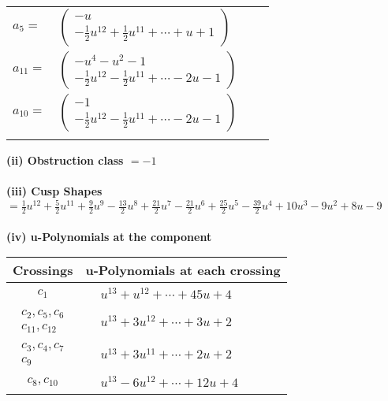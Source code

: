 \documentclass[1p]{elsarticle_modified}
\theoremstyle{definition}
\begin{document}
\begin{tabular}{m{7pt} m{180pt} m{7pt} m{180pt} }
\flushright $a_{5}=$&$\begin{pmatrix}- u\\-\frac{1}{2} u^{12}+\frac{1}{2} u^{11}+\cdots+u+1\end{pmatrix}$ \\
\flushright $a_{11}=$&$\begin{pmatrix}- u^4- u^2-1\\-\frac{1}{2} u^{12}-\frac{1}{2} u^{11}+\cdots-2 u-1\end{pmatrix}$ \\
\flushright $a_{10}=$&$\begin{pmatrix}-1\\-\frac{1}{2} u^{12}-\frac{1}{2} u^{11}+\cdots-2 u-1\end{pmatrix}$\\&\end{tabular}
\flushleft \textbf{(ii) Obstruction class $= -1$}\\~\\
\flushleft \textbf{(iii) Cusp Shapes $= \frac{1}{2} u^{12}+\frac{5}{2} u^{11}+\frac{9}{2} u^9-\frac{13}{2} u^8+\frac{21}{2} u^7-\frac{21}{2} u^6+\frac{25}{2} u^5-\frac{39}{2} u^4+10 u^3-9 u^2+8 u-9$}\\~\\
\newpage\renewcommand{\arraystretch}{1}
\flushleft \textbf{(iv) u-Polynomials at the component}\newline \\
\begin{tabular}{m{50pt}|m{274pt}}
Crossings & \hspace{64pt}u-Polynomials at each crossing \\
\hline $$\begin{aligned}c_{1}\end{aligned}$$&$\begin{aligned}
&u^{13}+u^{12}+\cdots+45 u+4
\end{aligned}$\\
\hline $$\begin{aligned}c_{2},c_{5},c_{6}\\c_{11},c_{12}\end{aligned}$$&$\begin{aligned}
&u^{13}+3 u^{12}+\cdots+3 u+2
\end{aligned}$\\
\hline $$\begin{aligned}c_{3},c_{4},c_{7}\\c_{9}\end{aligned}$$&$\begin{aligned}
&u^{13}+3 u^{11}+\cdots+2 u+2
\end{aligned}$\\
\hline $$\begin{aligned}c_{8},c_{10}\end{aligned}$$&$\begin{aligned}
&u^{13}-6 u^{12}+\cdots+12 u+4
\end{aligned}$\\
\hline
\end{tabular}\\~\\
\end{document}
